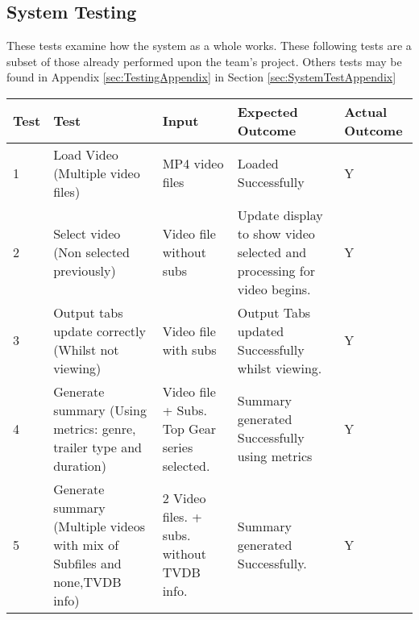 \subsection{System Testing}
These tests examine how the system as a whole works. These following tests are a subset of those already
performed upon the team's project. Others tests may be found in Appendix \ref{sec:TestingAppendix} in Section \ref{sec:SystemTestAppendix}

\begin{center}
\begin{tabular}{| p{18pt} | p{92pt}| p{68pt}| p{152pt} | p{44pt} |}
\hline
Test &Test														&Input				&Expected Outcome					&Actual Outcome
\\\hline
1	 &Load Video (Multiple video files)									&MP4 \newline video files			&Loaded Successfully						&Y			
\\\hline	
2	&Select video \newline (Non selected \newline previously)								&Video file \newline without subs	&Update display to show video selected and processing for video begins.		&Y
\\\hline	
3	&Output tabs \newline update correctly \newline (Whilst not \newline viewing)						&Video file \newline with subs &Output Tabs updated Successfully whilst viewing.	&Y					
\\\hline						
4	&Generate summary (Using metrics: \newline genre, trailer type and duration)			&Video file + \newline  Subs. Top \newline Gear series \newline selected.		&Summary generated Successfully using metrics&Y
\\\hline						
5	&Generate summary \newline (Multiple videos \newline with mix of Sub\newline  files and none,\newline TVDB info)	&2 Video files. \newline 1 + subs. \newline 1 without \newline TVDB info.	&Summary generated Successfully.	&Y

\end{tabular}
\end{center}
